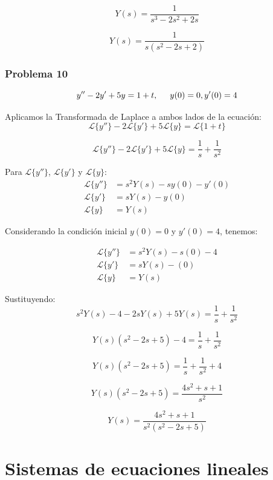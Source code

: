 \documentclass{article}
\begin{document}
\[
    Y(s) = \frac{1}{s^3 - 2s^2 + 2s}
\]

\[
    Y(s) = \frac{1}{s(s^2-2s+2)}
\]

\newpage


\subsubsection{Problema 10}
\[y'' - 2y' + 5y = 1 + t, \hspace{.5cm} y(0) = 0, y'(0) = 4\]

Aplicamos la Transformada de Laplace a ambos lados de la ecuación:
\[
    \mathcal{L}\{y''\} - 2\mathcal{L}\{y'\} + 5\mathcal{L}\{y\} = \mathcal{L}\{1 + t\}
\]

\[
    \mathcal{L}\{y''\} - 2\mathcal{L}\{y'\} + 5\mathcal{L}\{y\} = \frac{1}{s} + \frac{1}{s^2}
\]

Para \(\mathcal{L}\{y''\}\), \(\mathcal{L}\{y'\}\) y \(\mathcal{L}\{y\}\):
\begin{align*}
    \mathcal{L}\{y''\} & = s^2Y(s) - sy(0) - y'(0) \\
    \mathcal{L}\{y'\}  & = sY(s) - y(0)            \\
    \mathcal{L}\{y\}   & = Y(s)
\end{align*}

Considerando la condición inicial $y(0) = 0$ y $y'(0) = 4$, tenemos:

\begin{align*}
    \mathcal{L}\{y''\} & = s^2Y(s) - s(0) - 4 \\
    \mathcal{L}\{y'\}  & = sY(s) - (0)        \\
    \mathcal{L}\{y\}   & = Y(s)
\end{align*}

Sustituyendo:
\[
    s^2Y(s) - 4 - 2sY(s) + 5Y(s) = \frac{1}{s} + \frac{1}{s^2}
\]

\[
    Y(s)(s^2 - 2s + 5) - 4 = \frac{1}{s} + \frac{1}{s^2}
\]

\[
    Y(s)(s^2 - 2s + 5) = \frac{1}{s} + \frac{1}{s^2} + 4
\]

\[
    Y(s)(s^2 - 2s + 5) = \frac{4s^2+s+1}{s^2}
\]

\[
    Y(s) = \frac{4s^2+s+1}{s^2(s^2 - 2s + 5)}
\]

\newpage

\section{Sistemas de ecuaciones lineales}
\end{document}
